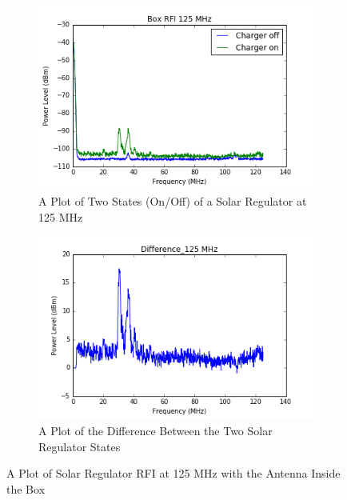 \documentclass[12pt,a4paper]{report}
\begin{document}
\begin{figure}[!htb]
	\centering
	\begin{subfigure}{.5\textwidth}
		\centering
		\includegraphics[width=.9\linewidth]{Figures/box_rfi_charger_on_125mhz_1.png}
		\caption{A Plot of Two States (On/Off) of a Solar Regulator at 125 MHz}
		\label{Fig:125}
	\end{subfigure}%
	\begin{subfigure}{.5\textwidth}
		\centering
		\includegraphics[width=.9\linewidth]{Figures/1Difference_125mhz.png}
		\caption{A Plot of the Difference Between the Two Solar Regulator States}
		\label{Fig:dif125}
	\end{subfigure}
	\caption{A Plot of Solar Regulator RFI at 125 MHz with the Antenna Inside the Box}
	\label{Fig:1}
\end{figure}
\end{document}
